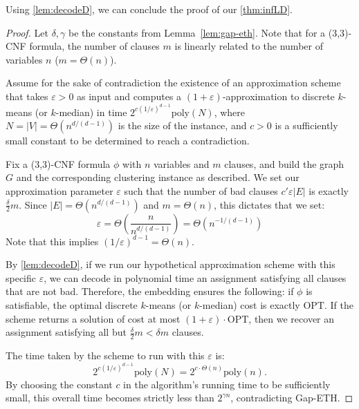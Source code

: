 \documentclass[11pt]{article}
\newcommand{\eps}{\varepsilon}
\newcommand{\poly}{\mathrm{ poly}}
\begin{document}
Using \cref{lem:decodeD}, we can conclude the proof of our \cref{thm:infLD}.
\begin{proof}
Let $\delta, \gamma$ be the constants from Lemma~\ref{lem:gap-eth}. Note that for a (3,3)-CNF formula, the number of clauses $m$ is linearly related to the number of variables $n$ ($m = \Theta(n)$).

Assume for the sake of contradiction the existence of an approximation scheme that takes $\eps > 0$ as input and computes a $(1+\eps)$-approximation to discrete $k$-means (or $k$-median) in time $2^{c(1/\eps)^{d-1}} \poly(N)$, where $N = |V| = \Theta(n^{d/(d-1)})$ is the size of the instance, and $c > 0$ is a sufficiently small constant to be determined to reach a contradiction.

Fix a (3,3)-CNF formula $\phi$ with $n$ variables and $m$ clauses, and build the graph $G$ and the corresponding clustering instance as described. We set our approximation parameter $\eps$ such that the number of bad clauses $c'\eps|E|$ is exactly $\frac{\delta}{2} m$. Since $|E| = \Theta(n^{d/(d-1)})$ and $m = \Theta(n)$, this dictates that we set:
\[ \eps = \Theta\left(\frac{n}{n^{d/(d-1)}}\right) = \Theta(n^{-1/(d-1)}) \]
Note that this implies $(1/\eps)^{d-1} = \Theta(n)$. 

By \cref{lem:decodeD}, if we run our hypothetical approximation scheme with this specific $\eps$, we can decode in polynomial time an assignment satisfying all clauses that are not bad. 
Therefore, the embedding ensures the following: if $\phi$ is satisfiable, the optimal discrete $k$-means (or $k$-median) cost is exactly $\text{OPT}$. If the scheme returns a solution of cost at most $(1+\eps)\cdot\text{OPT}$, then we recover an assignment satisfying all but $\frac{\delta}{2} m < \delta m$ clauses. 

The time taken by the scheme to run with this $\eps$ is:
\[ 2^{c\left(1/\eps\right)^{d-1}} \poly(N) =  2^{c \cdot \Theta(n)} \poly(n). \]
By choosing the constant $c$ in the algorithm's running time to be sufficiently small, this overall time becomes strictly less than $2^{\gamma n}$, contradicting Gap-ETH. 
\end{proof}
\end{document}
